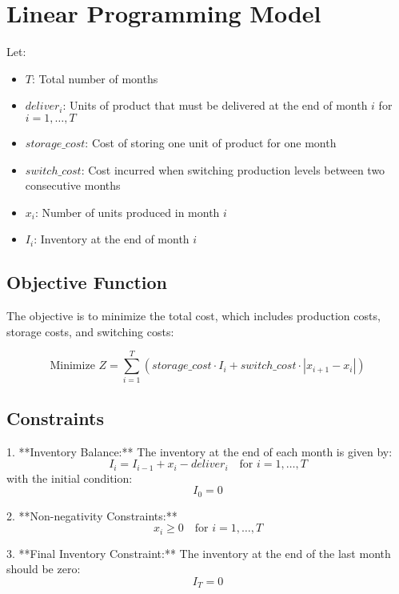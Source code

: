 \documentclass{article}
\begin{document}
\section*{Linear Programming Model}

Let:
\begin{itemize}
    \item $T$: Total number of months
    \item $deliver_i$: Units of product that must be delivered at the end of month $i$ for $i = 1, \ldots, T$
    \item $storage\_cost$: Cost of storing one unit of product for one month
    \item $switch\_cost$: Cost incurred when switching production levels between two consecutive months
    \item $x_i$: Number of units produced in month $i$
    \item $I_i$: Inventory at the end of month $i$
\end{itemize}

\subsection*{Objective Function}

The objective is to minimize the total cost, which includes production costs, storage costs, and switching costs:

\[
\text{Minimize } Z = \sum_{i=1}^{T} (storage\_cost \cdot I_i + switch\_cost \cdot |x_{i+1} - x_i|)
\]

\subsection*{Constraints}

1. **Inventory Balance:**
   The inventory at the end of each month is given by:
   \[
   I_i = I_{i-1} + x_i - deliver_i \quad \text{for } i = 1, \ldots, T
   \]
   with the initial condition:
   \[
   I_0 = 0
   \]

2. **Non-negativity Constraints:**
   \[
   x_i \geq 0 \quad \text{for } i = 1, \ldots, T
   \]
   
3. **Final Inventory Constraint:**
   The inventory at the end of the last month should be zero:
   \[
   I_T = 0
   \]
\end{document}
